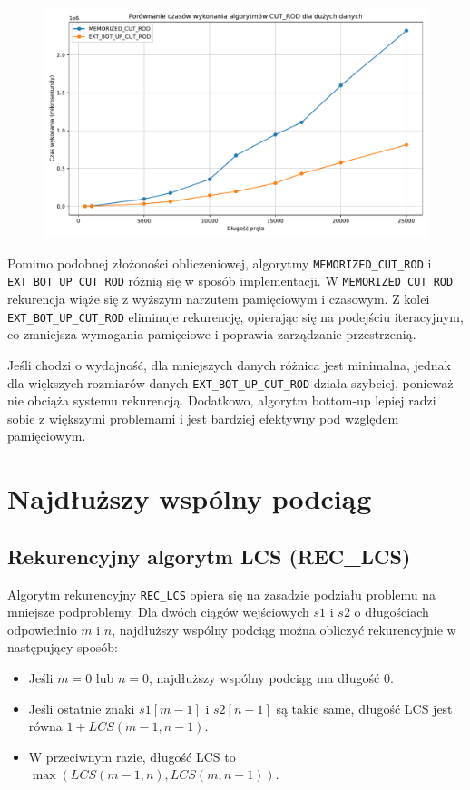 \documentclass{article}
\begin{document}
	\begin{figure}[H]
		\centering
		\includegraphics[width=1\textwidth]{wykres2.pdf}
	\end{figure}
	
	Pomimo podobnej złożoności obliczeniowej, algorytmy \texttt{MEMORIZED\_CUT\_ROD} i \texttt{EXT\_BOT\_UP\_CUT\_ROD} różnią się w sposób implementacji. W \texttt{MEMORIZED\_CUT\_ROD} rekurencja wiąże się z wyższym narzutem pamięciowym i czasowym. Z kolei \texttt{EXT\_BOT\_UP\_CUT\_ROD} eliminuje rekurencję, opierając się na podejściu iteracyjnym, co zmniejsza wymagania pamięciowe i poprawia zarządzanie przestrzenią.
	
	Jeśli chodzi o wydajność, dla mniejszych danych różnica jest minimalna, jednak dla większych rozmiarów danych \texttt{EXT\_BOT\_UP\_CUT\_ROD} działa szybciej, ponieważ nie obciąża systemu rekurencją. Dodatkowo, algorytm bottom-up lepiej radzi sobie z większymi problemami i jest bardziej efektywny pod względem pamięciowym.
	
	\section{Najdłuższy wspólny podciąg}

	\subsection{Rekurencyjny algorytm LCS (REC\_LCS)}
	Algorytm rekurencyjny \texttt{REC\_LCS} opiera się na zasadzie podziału problemu na mniejsze podproblemy. Dla dwóch ciągów wejściowych $s1$ i $s2$ o długościach odpowiednio $m$ i $n$, najdłuższy wspólny podciąg można obliczyć rekurencyjnie w następujący sposób:
	\begin{itemize}
		\item Jeśli $m = 0$ lub $n = 0$, najdłuższy wspólny podciąg ma długość 0.
		\item Jeśli ostatnie znaki $s1[m-1]$ i $s2[n-1]$ są takie same, długość LCS jest równa $1 + LCS(m-1, n-1)$.
		\item W przeciwnym razie, długość LCS to $\max(LCS(m-1, n), LCS(m, n-1))$.
	\end{itemize}
\end{document}
